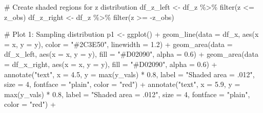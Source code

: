 \documentclass[
  letterpaper,
  DIV=11,
  numbers=noendperiod]{scrreprt}
\newenvironment{Shaded}{\begin{snugshade}}{\end{snugshade}}
\newcommand{\AttributeTok}[1]{\textcolor[rgb]{0.40,0.45,0.13}{#1}}
\newcommand{\CommentTok}[1]{\textcolor[rgb]{0.37,0.37,0.37}{#1}}
\newcommand{\DecValTok}[1]{\textcolor[rgb]{0.68,0.00,0.00}{#1}}
\newcommand{\FloatTok}[1]{\textcolor[rgb]{0.68,0.00,0.00}{#1}}
\newcommand{\FunctionTok}[1]{\textcolor[rgb]{0.28,0.35,0.67}{#1}}
\newcommand{\NormalTok}[1]{\textcolor[rgb]{0.00,0.23,0.31}{#1}}
\newcommand{\OtherTok}[1]{\textcolor[rgb]{0.00,0.23,0.31}{#1}}
\newcommand{\SpecialCharTok}[1]{\textcolor[rgb]{0.37,0.37,0.37}{#1}}
\newcommand{\StringTok}[1]{\textcolor[rgb]{0.13,0.47,0.30}{#1}}
\begin{document}
\begin{Shaded}
\begin{Highlighting}[]
\CommentTok{\# Create shaded regions for z distribution}
\NormalTok{df\_z\_left }\OtherTok{\textless{}{-}}\NormalTok{ df\_z }\SpecialCharTok{\%\textgreater{}\%} \FunctionTok{filter}\NormalTok{(z }\SpecialCharTok{\textless{}=}\NormalTok{ z\_obs)}
\NormalTok{df\_z\_right }\OtherTok{\textless{}{-}}\NormalTok{ df\_z }\SpecialCharTok{\%\textgreater{}\%} \FunctionTok{filter}\NormalTok{(z }\SpecialCharTok{\textgreater{}=} \SpecialCharTok{{-}}\NormalTok{z\_obs)}

\CommentTok{\# Plot 1: Sampling distribution}
\NormalTok{p1 }\OtherTok{\textless{}{-}} \FunctionTok{ggplot}\NormalTok{() }\SpecialCharTok{+}
  \FunctionTok{geom\_line}\NormalTok{(}\AttributeTok{data =}\NormalTok{ df\_x, }\FunctionTok{aes}\NormalTok{(}\AttributeTok{x =}\NormalTok{ x, }\AttributeTok{y =}\NormalTok{ y), }
            \AttributeTok{color =} \StringTok{"\#2C3E50"}\NormalTok{, }\AttributeTok{linewidth =} \FloatTok{1.2}\NormalTok{) }\SpecialCharTok{+}
  \FunctionTok{geom\_area}\NormalTok{(}\AttributeTok{data =}\NormalTok{ df\_x\_left, }\FunctionTok{aes}\NormalTok{(}\AttributeTok{x =}\NormalTok{ x, }\AttributeTok{y =}\NormalTok{ y),}
            \AttributeTok{fill =} \StringTok{"\#D02090"}\NormalTok{, }\AttributeTok{alpha =} \FloatTok{0.6}\NormalTok{) }\SpecialCharTok{+}
  \FunctionTok{geom\_area}\NormalTok{(}\AttributeTok{data =}\NormalTok{ df\_x\_right, }\FunctionTok{aes}\NormalTok{(}\AttributeTok{x =}\NormalTok{ x, }\AttributeTok{y =}\NormalTok{ y),}
            \AttributeTok{fill =} \StringTok{"\#D02090"}\NormalTok{, }\AttributeTok{alpha =} \FloatTok{0.6}\NormalTok{) }\SpecialCharTok{+}
  \FunctionTok{annotate}\NormalTok{(}\StringTok{"text"}\NormalTok{, }\AttributeTok{x =} \FloatTok{4.5}\NormalTok{, }\AttributeTok{y =} \FunctionTok{max}\NormalTok{(y\_vals) }\SpecialCharTok{*} \FloatTok{0.8}\NormalTok{,}
           \AttributeTok{label =} \StringTok{"Shaded area = .012"}\NormalTok{,}
           \AttributeTok{size =} \DecValTok{4}\NormalTok{, }\AttributeTok{fontface =} \StringTok{"plain"}\NormalTok{, }\AttributeTok{color =} \StringTok{"red"}\NormalTok{) }\SpecialCharTok{+}
  \FunctionTok{annotate}\NormalTok{(}\StringTok{"text"}\NormalTok{, }\AttributeTok{x =} \FloatTok{5.9}\NormalTok{, }\AttributeTok{y =} \FunctionTok{max}\NormalTok{(y\_vals) }\SpecialCharTok{*} \FloatTok{0.8}\NormalTok{,}
           \AttributeTok{label =} \StringTok{"Shaded area = .012"}\NormalTok{,}
           \AttributeTok{size =} \DecValTok{4}\NormalTok{, }\AttributeTok{fontface =} \StringTok{"plain"}\NormalTok{, }\AttributeTok{color =} \StringTok{"red"}\NormalTok{) }\SpecialCharTok{+}

\end{Highlighting}
\end{Shaded}
\end{document}
